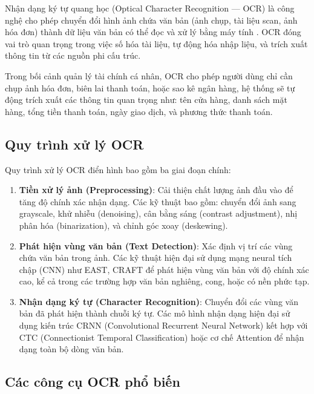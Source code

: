 Nhận dạng ký tự quang học (Optical Character Recognition --- OCR) là công nghệ cho phép chuyển đổi hình ảnh chứa văn bản (ảnh chụp, tài liệu scan, ảnh hóa đơn) thành dữ liệu văn bản có thể đọc và xử lý bằng máy tính \cite{ref13}. OCR đóng vai trò quan trọng trong việc số hóa tài liệu, tự động hóa nhập liệu, và trích xuất thông tin từ các nguồn phi cấu trúc.

Trong bối cảnh quản lý tài chính cá nhân, OCR cho phép người dùng chỉ cần chụp ảnh hóa đơn, biên lai thanh toán, hoặc sao kê ngân hàng, hệ thống sẽ tự động trích xuất các thông tin quan trọng như: tên cửa hàng, danh sách mặt hàng, tổng tiền thanh toán, ngày giao dịch, và phương thức thanh toán.

\subsection{Quy trình xử lý OCR}
\label{subsec:ocr_pipeline}

Quy trình xử lý OCR điển hình bao gồm ba giai đoạn chính:

\begin{enumerate}
    \item \textbf{Tiền xử lý ảnh (Preprocessing)}: Cải thiện chất lượng ảnh đầu vào để tăng độ chính xác nhận dạng. Các kỹ thuật bao gồm: chuyển đổi ảnh sang grayscale, khử nhiễu (denoising), cân bằng sáng (contrast adjustment), nhị phân hóa (binarization), và chỉnh góc xoay (deskewing).

    \item \textbf{Phát hiện vùng văn bản (Text Detection)}: Xác định vị trí các vùng chứa văn bản trong ảnh. Các kỹ thuật hiện đại sử dụng mạng neural tích chập (CNN) như EAST, CRAFT để phát hiện vùng văn bản với độ chính xác cao, kể cả trong các trường hợp văn bản nghiêng, cong, hoặc có nền phức tạp.

    \item \textbf{Nhận dạng ký tự (Character Recognition)}: Chuyển đổi các vùng văn bản đã phát hiện thành chuỗi ký tự. Các mô hình nhận dạng hiện đại sử dụng kiến trúc CRNN (Convolutional Recurrent Neural Network) kết hợp với CTC (Connectionist Temporal Classification) hoặc cơ chế Attention để nhận dạng toàn bộ dòng văn bản.
\end{enumerate}

\subsection{Các công cụ OCR phổ biến}
\label{subsec:ocr_tools}

